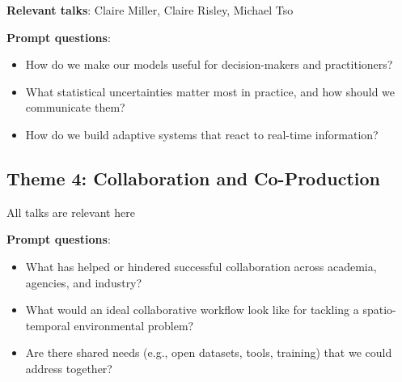 \documentclass[
  11pt,
  letterpaper,
  DIV=11,
  numbers=noendperiod]{scrartcl}
\begin{document}
\textbf{Relevant talks}: Claire Miller, Claire Risley, Michael Tso

\textbf{Prompt questions}:

\begin{itemize}
\item
  How do we make our models useful for decision-makers and
  practitioners?
\item
  What statistical uncertainties matter most in practice, and how should
  we communicate them?
\item
  How do we build adaptive systems that react to real-time information?
\end{itemize}

\subsection{Theme 4: Collaboration and
Co-Production}\label{theme-4-collaboration-and-co-production}

All talks are relevant here

\textbf{Prompt questions}:

\begin{itemize}
\item
  What has helped or hindered successful collaboration across academia,
  agencies, and industry?
\item
  What would an ideal collaborative workflow look like for tackling a
  spatio-temporal environmental problem?
\item
  Are there shared needs (e.g., open datasets, tools, training) that we
  could address together?
\end{itemize}
\end{document}
